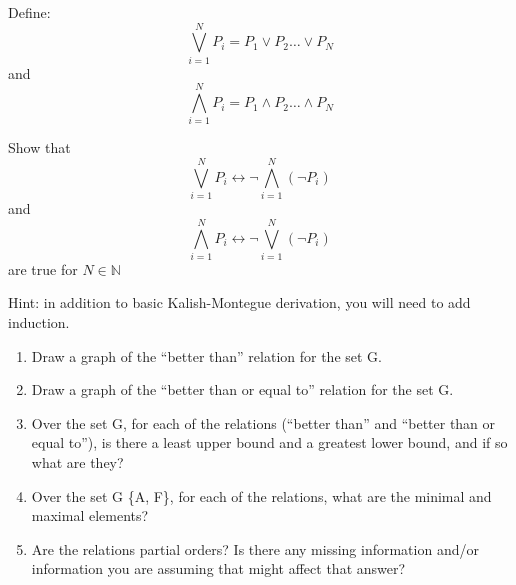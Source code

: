 \documentclass[12pt]{article}
\newenvironment{solution}[2][Solution]{ \begin{trivlist}
\item[\hskip \labelsep {\bfseries #1}]}{\end{trivlist}}
\newenvironment{problem}[2][Problem]{\begin{trivlist}
\item[\hskip \labelsep {\bfseries #1}\hskip \labelsep {\bfseries #2.}]}{\end{trivlist}}
\begin{document}
\vskip 0.5in
\begin{problem}{7}
Define:
\[
\bigvee_{i = 1}^N P_i = P_1 \vee P_2 \ldots \vee P_N
\]
and
\[
\bigwedge_{i = 1}^N P_i = P_1 \wedge P_2 \ldots \wedge P_N
\]

Show that
\[
\bigvee_{i = 1}^N P_i \leftrightarrow \lnot \bigwedge_{i = 1}^N (\lnot P_i)
\]
and
\[
\bigwedge_{i = 1}^N P_i \leftrightarrow \lnot \bigvee_{i = 1}^N (\lnot P_i)
\]
are true for $N \in \mathbb{N}$

Hint: in addition to basic Kalish-Montegue derivation, you will need to add induction.
\item[]
\begin{enumerate}[label=\alph*)]
    \item Draw a graph of the “better than” relation for the set G.
    \item Draw a graph of the “better than or equal to” relation for the set G.
    \item Over the set G, for each of the relations (“better than” and “better than or equal to”), is there a least upper bound and a greatest lower bound, and if so what are they?
    \item Over the set G \textminus  \{A, F\}, for each of the relations, what are the minimal and maximal elements?
    \item Are the relations partial orders? Is there any missing information and/or information you are assuming that might affect that answer?
\end{enumerate}
\end{problem}
\begin{solution}{7}
\item[]
\end{solution}
\vskip 0.5in


\end{document}
